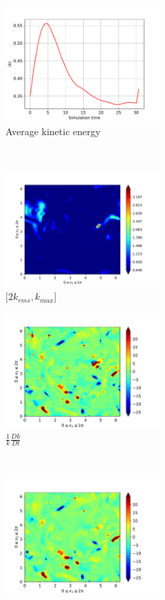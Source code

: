 \begin{figure}[H]
    \begin{subfigure}[H]{0.45\textwidth}
        \includegraphics[height=1.75in]{media/run-cds-65/ke-average1380}
        \caption{Average kinetic energy}
    \end{subfigure}
    ~
    \begin{subfigure}[H]{0.45\textwidth}
        \includegraphics[height=1.75in]{media/run-cds-65/ke-2-1380}
        \caption{$[2k_{rms}, k_{max} $] }
    \end{subfigure}
    \newline
    \begin{subfigure}[H]{0.45\textwidth}
        \includegraphics[height=1.75in]{media/run-cds-65/ke-1380}
        \caption{$\frac{1}{k} \frac{D k}{Dt}$}
    \end{subfigure}
    ~
    \begin{subfigure}{0.45\textwidth}
        \includegraphics[height=1.75in]{media/run-cds-65/A-ke-1380}

\end{subfigure}
\end{figure}
